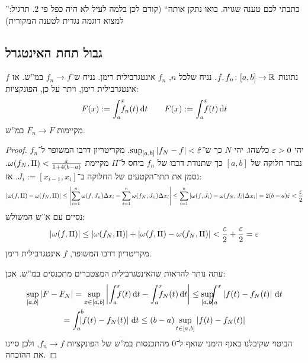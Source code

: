 \documentclass[]{../../../../tex/classes/styledArticle}
\begin{document}
	''כתבתי לכם טענה שגויה. בואו נתקן אותה`` (קודם לכן בלמה לעיל לא היה כפל פי $2$. תרגיל: למצוא דוגמה נגדית לטענה המקורית)
	
	\subsection*{גבול תחת האינטגרל}
	\begin{Theorem}
		נתונות $f, f_n \colon [a, b] \to \mathbb{R}$. נניח שלכל $n$, $f_n$ אינטגרבילית רימן. נניח ש־$f_n \to f$ במ''ש. אז $f$ אינטגרבילית רימן, ויתר על כן, הפונקציות: 
		\[ F(x) := \int^{x}_a \dequad \ f_n(t)\dt \quad \quad F(x) := \int^{x}_a \dequad \ f(t)\dt \] 
		מקיימות $F_n \to F$ במ''ש. 
	\end{Theorem}
	\begin{proof}
		יהי $\eg > 0$ כלשהו. יהי $N$ כך ש־$\sup_{[a, b]}\sof{f_N - f} < \hat \eg$. מקריטריון דרבו המשופר ל־$f_n$ נבחר חלוקה של $[a, b]$ כך שתנודת דרבו של $f_n$ ביחס ל־$\Pi$ מקיימת $\wg(f_N, \Pi) < \frac{\eg}{1 + 4(b - a)}$. נסמן את תתי־הקטעים של החלוקה ב־$J_i := [x_{i - 1}, x_i]$. אז: 
		\[ \sof{\wg(f, \Pi) - \wg(f_N, \Pi)} \le \sof{\sum_{i = 1}^{n}\wg(f, J_n) \Delta x_i - \sum_{i =1}^{n}\wg(f_N, J_n)\Delta x_i} \le \sum_{i = 1}^{n}\sof{\wg(f, J_i) - \wg(f_N, J_i)\Delta x_i} = 2(b - a)\hat \eg < \frac{\eg}{2} \]
		נסיים עם א''ש המשולש: 
		\[ \sof{\wg(f, \Pi)} \le \sof{\wg(f_N, \Pi)} + \sof{\wg(f, \Pi) - \wg(f_N, \Pi)} < \frac{\eg}{2} + \frac{\eg}{2} = \eg \]
		מקריטריון דרבו המשופר, $f$ אינטגרבילית רימן. 
		
		עתה נותר להראות שהאינטגרבילית המצטברים מתכנסים במ''ש. אכן: 
		\begin{multline*}
			\sup_{[a, b]} \sof{F - F_N} = \sup_{x \in [a, b]}\sof{\int^{x}_a \dequad \ f(t)\dt - \int^{x}_a \dequad \ f_N(t) \dt} \le \sup_{[a, b]}\dequad \ \int^{x}_a \sof{f(t) - f_N(t)} \dt \\
			= \int^{b}_a \dequad \ \sof{f(t) - f_N(t)}\dt \le (b - a) \sup_{t \in [a, b]} \sof{f(t) - f_N(t)}
		\end{multline*}
		הביטוי שקיבלנו באגף הימני שואף ל־$0$ מהתכנסות במ''ש של הפונקציות $f_n \to f$, ולכן סיינו את ההוכחה. 
	\end{proof}
	
	
\end{document}
